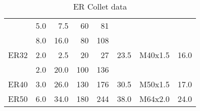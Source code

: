 \begin{table}[h]
\begin{tabular}{@{}l|r@{ - }rrrrlr}
        &5.0&7.5
        & 60 & 81
        &
        & %
        & %
        \\

        &8.0&16.0&
        80 &108
        &
        & %
        & %
        \\

    ER32
        &2.0&2.5
        &20 & 27
        &23.5
        &M40x1.5
        &16.0
        \\

        &2.0&20.0
        &100 &136
        &
        & %
        & %
        \\

    ER40
        &3.0&26.0
        &130 &176
        &30.5
        &M50x1.5
        &17.0
        \\

    ER50
        &6.0&34.0
        &180 &244
        &38.0
        &M64x2.0
        &24.0
        \\

\end{tabular}
\caption{ER Collet data}
\end{table}
